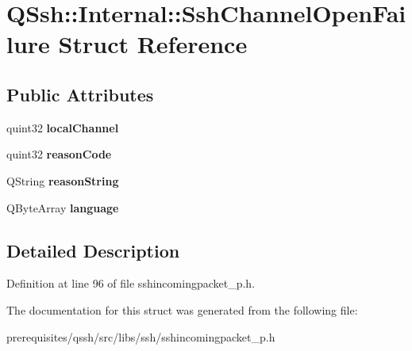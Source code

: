\hypertarget{struct_q_ssh_1_1_internal_1_1_ssh_channel_open_failure}{}\section{Q\+Ssh\+:\+:Internal\+:\+:Ssh\+Channel\+Open\+Failure Struct Reference}
\label{struct_q_ssh_1_1_internal_1_1_ssh_channel_open_failure}
\subsection*{Public Attributes}
\begin{DoxyCompactItemize}
\item 
\mbox{\label{struct_q_ssh_1_1_internal_1_1_ssh_channel_open_failure_a00f61076cdb5708f367ec7971fe60145}} 
quint32 {\bfseries local\+Channel}
\item 
\mbox{\label{struct_q_ssh_1_1_internal_1_1_ssh_channel_open_failure_a9655abf0a4c03c11352f9c9354b3e425}} 
quint32 {\bfseries reason\+Code}
\item 
\mbox{\label{struct_q_ssh_1_1_internal_1_1_ssh_channel_open_failure_aa80187bcfec873aa41579fb188855501}} 
Q\+String {\bfseries reason\+String}
\item 
\mbox{\label{struct_q_ssh_1_1_internal_1_1_ssh_channel_open_failure_aef68527a799c4445ec94898bc66cc5b8}} 
Q\+Byte\+Array {\bfseries language}
\end{DoxyCompactItemize}


\subsection{Detailed Description}


Definition at line 96 of file sshincomingpacket\+\_\+p.\+h.



The documentation for this struct was generated from the following file\+:\begin{DoxyCompactItemize}
\item 
prerequisites/qssh/src/libs/ssh/sshincomingpacket\+\_\+p.\+h\end{DoxyCompactItemize}
